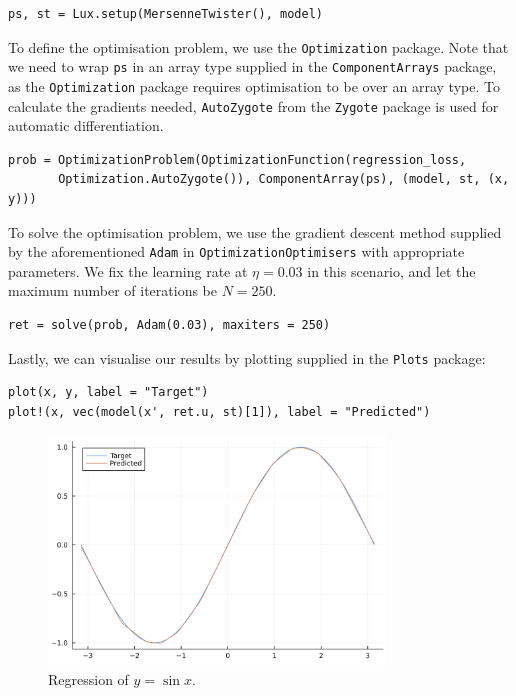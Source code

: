 \documentclass[a4paper,11pt,titlepage]{article}
\theoremstyle{definition}
\theoremstyle{plain}
\theoremstyle{remark}
\begin{document}
\begin{verbatim}
ps, st = Lux.setup(MersenneTwister(), model)
\end{verbatim}

To define the optimisation problem, we use the \verb|Optimization| package. Note that we need to wrap \verb|ps| in an array type supplied in the \verb|ComponentArrays| package, as the \verb|Optimization| package requires optimisation to be over an array type. To calculate the gradients needed, \verb|AutoZygote| from the \verb|Zygote| package is used for automatic differentiation.

\begin{verbatim}
prob = OptimizationProblem(OptimizationFunction(regression_loss,
       Optimization.AutoZygote()), ComponentArray(ps), (model, st, (x, y)))
\end{verbatim}

To solve the optimisation problem, we use the gradient descent method supplied by the aforementioned \verb|Adam| in \verb|OptimizationOptimisers| with appropriate parameters. We fix the learning rate at $\eta = 0.03$ in this scenario, and let the maximum number of iterations be $N = 250$.

\begin{verbatim}
ret = solve(prob, Adam(0.03), maxiters = 250)
\end{verbatim}

Lastly, we can visualise our results by plotting supplied in the \verb|Plots| package:

\begin{verbatim}
plot(x, y, label = "Target")
plot!(x, vec(model(x', ret.u, st)[1]), label = "Predicted")
\end{verbatim}

\begin{figure}[htbp]
    \centering
    \includegraphics[width=0.8\textwidth]{figures/Regression.png}
    \caption{Regression of $y = \sin x$.}
    \label{fig:regression}
\end{figure}
\end{document}
